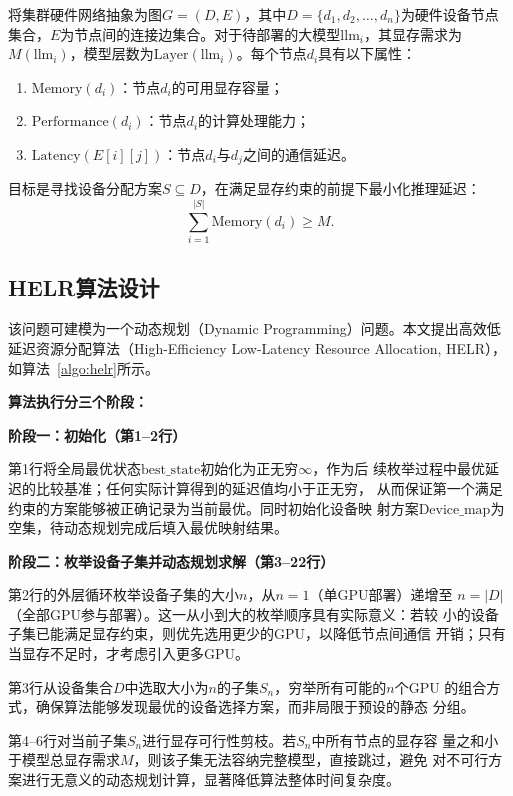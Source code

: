 将集群硬件网络抽象为图$G = (D, E)$，其中$D = \{d_1, d_2, \ldots, d_n\}$为硬件设备节点集合，$E$为节点间的连接边集合。对于待部署的大模型$\text{llm}_i$，其显存需求为$M(\text{llm}_i)$，模型层数为$\text{Layer}(\text{llm}_i)$。每个节点$d_i$具有以下属性：
\begin{enumerate}
    \item $\text{Memory}(d_i)$：节点$d_i$的可用显存容量；
    \item $\text{Performance}(d_i)$：节点$d_i$的计算处理能力；
    \item $\text{Latency}(E[i][j])$：节点$d_i$与$d_j$之间的通信延迟。
\end{enumerate}
目标是寻找设备分配方案$S \subseteq D$，在满足显存约束的前提下最小化推理延迟：
\begin{equation}
    \sum_{i=1}^{|S|} \text{Memory}(d_i) \geq M.
    \label{eq:memory_constraint}
\end{equation}

\subsection{HELR算法设计}

该问题可建模为一个动态规划（Dynamic Programming）问题。本文提出高效低延迟资源分配算法（High-Efficiency Low-Latency Resource Allocation, HELR），如算法~\ref{algo:helr}所示。



\textbf{算法执行分三个阶段：}

\textbf{阶段一：初始化（第1--2行）}

第1行将全局最优状态$\text{best\_state}$初始化为正无穷$\infty$，作为后
续枚举过程中最优延迟的比较基准；任何实际计算得到的延迟值均小于正无穷，
从而保证第一个满足约束的方案能够被正确记录为当前最优。同时初始化设备映
射方案$\text{Device\_map}$为空集，待动态规划完成后填入最优映射结果。

\textbf{阶段二：枚举设备子集并动态规划求解（第3--22行）}

第2行的外层循环枚举设备子集的大小$n$，从$n=1$（单GPU部署）递增至
$n=|D|$（全部GPU参与部署）。这一从小到大的枚举顺序具有实际意义：若较
小的设备子集已能满足显存约束，则优先选用更少的GPU，以降低节点间通信
开销；只有当显存不足时，才考虑引入更多GPU。

第3行从设备集合$D$中选取大小为$n$的子集$S_n$，穷举所有可能的$n$个GPU
的组合方式，确保算法能够发现最优的设备选择方案，而非局限于预设的静态
分组。

第4--6行对当前子集$S_n$进行显存可行性剪枝。若$S_n$中所有节点的显存容
量之和小于模型总显存需求$M$，则该子集无法容纳完整模型，直接跳过，避免
对不可行方案进行无意义的动态规划计算，显著降低算法整体时间复杂度。


